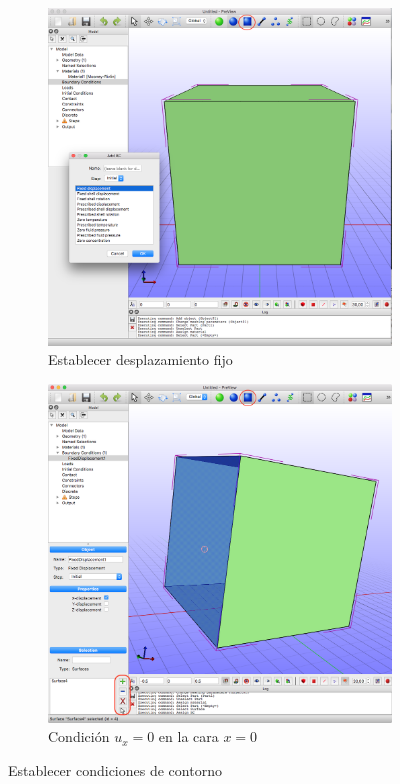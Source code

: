 \begin{figure}[!htp]
\centering
\begin{subfigure}[b]{0.48\textwidth}
\includegraphics[width=\textwidth]{figuras_3/scr-pre-06m.png}
\caption{Establecer desplazamiento fijo}
\label{fig:pre-06}
\end{subfigure}
\begin{subfigure}[b]{0.48\textwidth}
\includegraphics[width=\textwidth]{figuras_3/scr-pre-07m.png}
\caption{Condición $u_{x}=0$ en la cara $x=0$}
\label{fig:pre-07}
\end{subfigure}
\caption{Establecer condiciones de contorno}
\label{fig:pre-06-07}
\end{figure}
